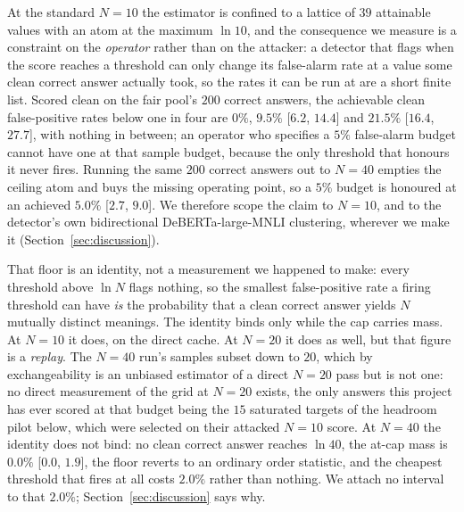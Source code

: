 At the standard $N{=}10$ the
estimator is confined to a lattice of $39$ attainable values with an atom at the maximum
$\ln 10$, and the consequence we measure is a constraint on the \emph{operator} rather than on
the attacker: a detector that flags when the score reaches a threshold can only change its
false-alarm rate at a value some clean correct answer actually took, so the rates it can be
run at are a short finite list. Scored clean on the fair pool's $200$ correct answers, the
achievable clean false-positive rates below one in four are $0\%$, $9.5\%$ [$6.2$, $14.4$]
and $21.5\%$ [$16.4$, $27.7$], with nothing in between; an operator who specifies a $5\%$
false-alarm budget cannot have one at that sample budget, because the only threshold that
honours it never fires. Running the same $200$ correct answers out to $N{=}40$ empties the
ceiling atom and buys the missing operating point, so a $5\%$ budget is honoured at an
achieved $5.0\%$ [$2.7$, $9.0$]. We therefore scope the claim to $N{=}10$, and to the
detector's own bidirectional DeBERTa-large-MNLI clustering, wherever we make it
(Section~\ref{sec:discussion}).

That floor is an identity, not a measurement we happened to make: every threshold above
$\ln N$ flags nothing, so the smallest false-positive rate a firing threshold can have
\emph{is} the probability that a clean correct answer yields $N$ mutually distinct meanings.
The identity binds only while the cap carries mass. At $N{=}10$ it does, on the direct
cache. At $N{=}20$ it does as well, but that figure is a \emph{replay}. The $N{=}40$ run's
samples subset down to $20$, which by exchangeability is an unbiased estimator of a direct
$N{=}20$ pass but is not one: no direct measurement of the grid at $N{=}20$ exists, the
only answers this project has ever scored at that budget being the $15$ saturated targets
of the headroom pilot below, which were selected on their attacked $N{=}10$ score. At
$N{=}40$ the identity does not bind: no clean correct answer reaches $\ln 40$, the at-cap
mass is $0.0\%$ [$0.0$, $1.9$], the floor reverts to an ordinary order statistic, and the
cheapest threshold that fires at all costs $2.0\%$ rather than nothing. We attach no
interval to that $2.0\%$; Section~\ref{sec:discussion} says why.

